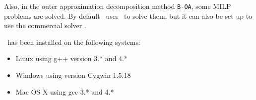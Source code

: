 Also, in the outer approximation decomposition method {\tt B-OA}, some MILP problems are
solved. By default \Bonmin\ uses  \Cbc\ to solve them, but it can also be set up to use
the commercial solver .

\Bonmin\ has been installed on the following systems:
\begin{itemize}
\item Linux using g++ version 3.* and 4.*
\item Windows using version Cygwin 1.5.18
\item Mac OS X using gcc 3.* and 4.*
\end{itemize}

